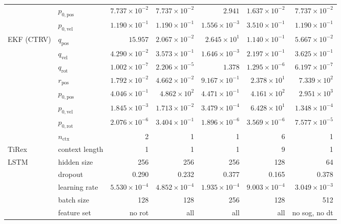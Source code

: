 \begin{table}[htbp]
\begin{tabular}{llrrrrr}
               & $p_{0,\text{pos}}$    & $7.737 \times 10^{-2}$ & $7.737 \times 10^{-2}$ & $2.941$                & $1.637 \times 10^{-2}$ & $7.737 \times 10^{-2}$ \\
               & $p_{0,\text{vel}}$    & $1.190 \times 10^{-1}$ & $1.190 \times 10^{-1}$ & $1.556 \times 10^{-3}$ & $3.510 \times 10^{-1}$ & $1.190 \times 10^{-1}$ \\
EKF (CTRV)     & $q_\text{pos}$        & $15.957$               & $2.067 \times 10^{-2}$ & $2.645 \times 10^{1}$  & $1.140 \times 10^{-1}$ & \cellcolor{green!15}$5.667 \times 10^{-2}$ \\
               & $q_\text{vel}$        & $4.290 \times 10^{-2}$ & $3.573 \times 10^{-1}$ & $1.646 \times 10^{-3}$ & $2.197 \times 10^{-1}$ & $3.625 \times 10^{-1}$ \\
               & $q_\text{rot}$        & $1.002 \times 10^{-7}$ & $2.206 \times 10^{-5}$ & $1.378$                & $1.295 \times 10^{-6}$ & $6.197 \times 10^{-7}$ \\
               & $r_\text{pos}$        & $1.792 \times 10^{-2}$ & $4.662 \times 10^{-2}$ & $9.167 \times 10^{-1}$ & $2.378 \times 10^{1}$  & \cellcolor{green!15}$7.339 \times 10^{2}$  \\
               & $p_{0,\text{pos}}$    & $4.046 \times 10^{-1}$ & $4.862 \times 10^{2}$  & $4.471 \times 10^{-1}$ & $4.161 \times 10^{2}$  & $2.951 \times 10^{3}$  \\
               & $p_{0,\text{vel}}$    & $1.845 \times 10^{-3}$ & $1.713 \times 10^{-2}$ & $3.479 \times 10^{-4}$ & $6.428 \times 10^{1}$  & $1.348 \times 10^{-4}$ \\
               & $p_{0,\text{rot}}$    & $2.076 \times 10^{-6}$ & $3.404 \times 10^{-1}$ & $1.896 \times 10^{-6}$ & $3.569 \times 10^{-6}$ & $7.577 \times 10^{-5}$ \\
               & $n_\text{ctx}$        & 2                      & 1                      & 1                      & \cellcolor{cyan!15}6   & 1                      \\
\midrule
TiRex          & context length        & 1      & 1      & 1      & \cellcolor{cyan!15}9      & 1     \\
\midrule
LSTM           & hidden size           & 256   & 256   & 256   & 128   & \cellcolor{orange!15}64   \\
               & dropout               & 0.290 & 0.232 & 0.377 & 0.165 & 0.378 \\
               & learning rate         & $5.530 \times 10^{-4}$ & $4.852 \times 10^{-4}$ & $1.935 \times 10^{-4}$ & $9.003 \times 10^{-4}$ & $3.049 \times 10^{-3}$ \\
               & batch size            & 128   & 128   & 256   & 128   & \cellcolor{orange!15}512   \\
               & feature set           & no rot   & all   & all   & all   & \cellcolor{orange!15}no sog, no dt \\
\bottomrule
\end{tabular}
\vspace{-0.2em} %
\end{table}

